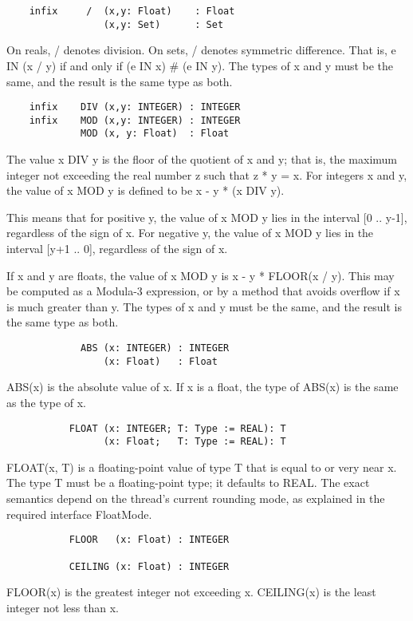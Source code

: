 \documentclass[10pt]{article}
\begin{document}
\begin{verbatim}
    infix     /  (x,y: Float)    : Float
                 (x,y: Set)      : Set
\end{verbatim}
On reals, / denotes division. On sets, / denotes symmetric difference. That
is, e IN (x / y) if and only if (e IN x) \# (e IN y). The types of x and y
must be the same, and the result is the same type as both.

\begin{verbatim}
    infix    DIV (x,y: INTEGER) : INTEGER
    infix    MOD (x,y: INTEGER) : INTEGER
             MOD (x, y: Float)  : Float
\end{verbatim}
The value x DIV y is the floor of the quotient of x and y; that is, the
maximum integer not exceeding the real number z such that z * y = x. For
integers x and y, the value of x MOD y is defined to be x - y * (x DIV y).

This means that for positive y, the value of x MOD y lies in the interval [0
.. y-1], regardless of the sign of x. For negative y, the value of x MOD y
lies in the interval [y+1 .. 0], regardless of the sign of x.

If x and y are floats, the value of x MOD y is x - y * FLOOR(x / y). This may
be computed as a Modula-3 expression, or by a method that avoids overflow if x
is much greater than y. The types of x and y must be the same, and the result
is the same type as both.

\begin{verbatim}
             ABS (x: INTEGER) : INTEGER
                 (x: Float)   : Float
\end{verbatim}
ABS(x) is the absolute value of x. If x is a float, the type of ABS(x) is the
same as the type of x.

\begin{verbatim}
           FLOAT (x: INTEGER; T: Type := REAL): T
                 (x: Float;   T: Type := REAL): T
\end{verbatim}
FLOAT(x, T) is a floating-point value of type T that is equal to or very near
x. The type T must be a floating-point type; it defaults to REAL. The exact
semantics depend on the thread's current rounding mode, as explained in the
required interface FloatMode.

\begin{verbatim}
           FLOOR   (x: Float) : INTEGER

           CEILING (x: Float) : INTEGER
\end{verbatim}
FLOOR(x) is the greatest integer not exceeding x. CEILING(x) is the least
integer not less than x.
\end{document}
